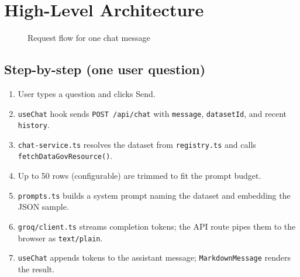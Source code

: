 \documentclass[11pt,a4paper]{article}
\begin{document}
\section{High-Level Architecture}

\begin{figure}[h]
\centering
{}
\caption{Request flow for one chat message}
\end{figure}

\subsection{Step-by-step (one user question)}
\begin{enumerate}
  \item User types a question and clicks Send.
  \item \texttt{useChat} hook sends \texttt{POST /api/chat} with \texttt{message}, \texttt{datasetId}, and recent \texttt{history}.
  \item \texttt{chat-service.ts} resolves the dataset from \texttt{registry.ts} and calls \texttt{fetchDataGovResource()}.
  \item Up to 50 rows (configurable) are trimmed to fit the prompt budget.
  \item \texttt{prompts.ts} builds a system prompt naming the dataset and embedding the JSON sample.
  \item \texttt{groq/client.ts} streams completion tokens; the API route pipes them to the browser as \texttt{text/plain}.
  \item \texttt{useChat} appends tokens to the assistant message; \texttt{MarkdownMessage} renders the result.
\end{enumerate}
\end{document}
